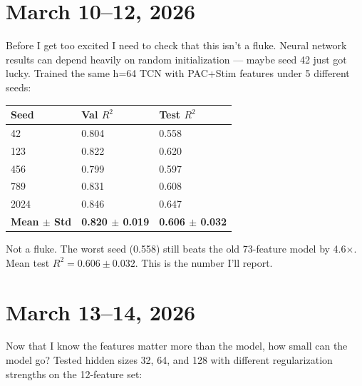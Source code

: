 \documentclass[11pt,letterpaper]{article}
\begin{document}
\section*{March 10--12, 2026}

Before I get too excited I need to check that this isn't a fluke. Neural network results can
depend heavily on random initialization --- maybe seed 42 just got lucky. Trained the same
h=64 TCN with PAC+Stim features under 5 different seeds:

\vspace{0.5em}
\begin{tabular}{@{}lll@{}}
\toprule
\textbf{Seed}             & \textbf{Val $R^2$}          & \textbf{Test $R^2$} \\
\midrule
42                        & 0.804                       & 0.558 \\
123                       & 0.822                       & 0.620 \\
456                       & 0.799                       & 0.597 \\
789                       & 0.831                       & 0.608 \\
2024                      & 0.846                       & 0.647 \\
\textbf{Mean $\pm$ Std}   & \textbf{0.820 $\pm$ 0.019}  & \textbf{0.606 $\pm$ 0.032} \\
\bottomrule
\end{tabular}
\vspace{0.5em}

Not a fluke. The worst seed (0.558) still beats the old 73-feature model by 4.6$\times$.
Mean test $R^2 = 0.606 \pm 0.032$. This is the number I'll report.

\section*{March 13--14, 2026}

Now that I know the features matter more than the model, how small can the model go? Tested
hidden sizes 32, 64, and 128 with different regularization strengths on the 12-feature set:
\end{document}
